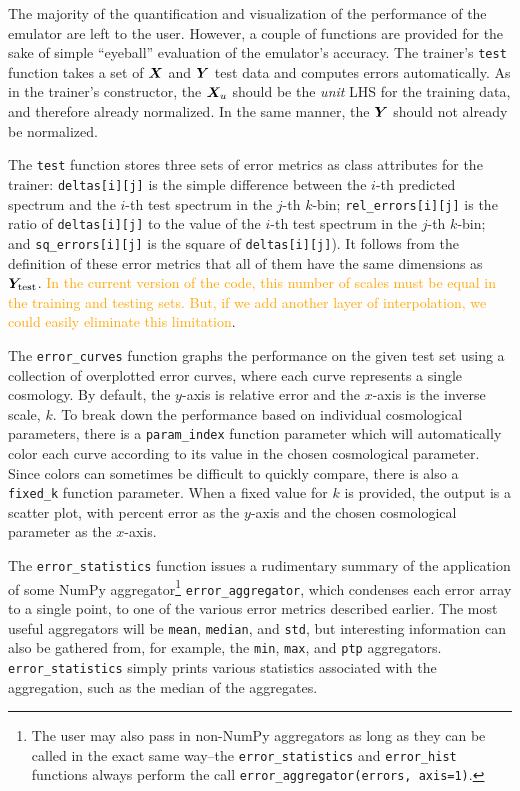 The majority of the quantification and visualization of the performance of the
emulator are left to the user. However, a couple of functions are provided for 
the sake of simple ``eyeball'' evaluation of the emulator's accuracy.
The trainer's \texttt{test} function takes a set of $\bm{X}$ and $\bm{Y}$ 
test data and computes errors automatically. As in the trainer's constructor,
the $\bm{X}_u$ should be the \textit{unit} LHS for the training data, and
therefore already normalized. In the same manner, the $\bm{Y}$ should not
already be normalized.

The \texttt{test} function stores three sets of error 
metrics as class attributes for the trainer: \texttt{deltas[i][j]}
is the simple difference between the $i$-th predicted spectrum and the
$i$-th test spectrum in the $j$-th $k$-bin;
\verb|rel_errors[i][j]| is the ratio of \texttt{deltas[i][j]} to the
value of the $i$-th test spectrum in the $j$-th $k$-bin; and
\verb|sq_errors[i][j]| is the square of \texttt{deltas[i][j]}).
It follows from the definition of these error metrics that all of them have 
the same dimensions as $\bm{Y}_\text{test}$.
\textcolor{orange}{In the current
version of the code, this number of scales must be equal in the training and
testing sets. But, if we add another layer of interpolation, we could easily
eliminate this limitation}.

The \verb|error_curves| function graphs the performance on the given test set 
using a collection of overplotted error curves, where each curve represents a 
single cosmology. By default, the $y$-axis is relative error and the
$x$-axis is the inverse scale, $k$. To break down the performance based on 
individual cosmological parameters, there is a \verb|param_index| function
parameter which will automatically color each curve according to its value in 
the chosen cosmological parameter. Since colors can sometimes be difficult to 
quickly compare, there is also a \verb|fixed_k| function parameter. When a 
fixed value for $k$ is provided, the output is a scatter 
plot, with percent error as the $y$-axis and the chosen cosmological parameter 
as the $x$-axis.

The \verb|error_statistics| function issues a rudimentary summary of the 
application of some NumPy aggregator\footnote{The user may also pass in
non-NumPy aggregators as long as they can be called in the exact same
way--the \verb|error_statistics| and \verb|error_hist| functions always
perform the call \verb|error_aggregator(errors, axis=1)|.}
\verb|error_aggregator|, which condenses each error array to a single point,
to one of the various error metrics described earlier. The 
most useful aggregators will be \verb|mean|, \verb|median|, and \verb|std|, 
but interesting information can also be gathered from, for example, the
\verb|min|, \verb|max|, and \verb|ptp| aggregators.
\verb|error_statistics| simply prints various statistics associated with the 
aggregation, such as the median of the aggregates.

